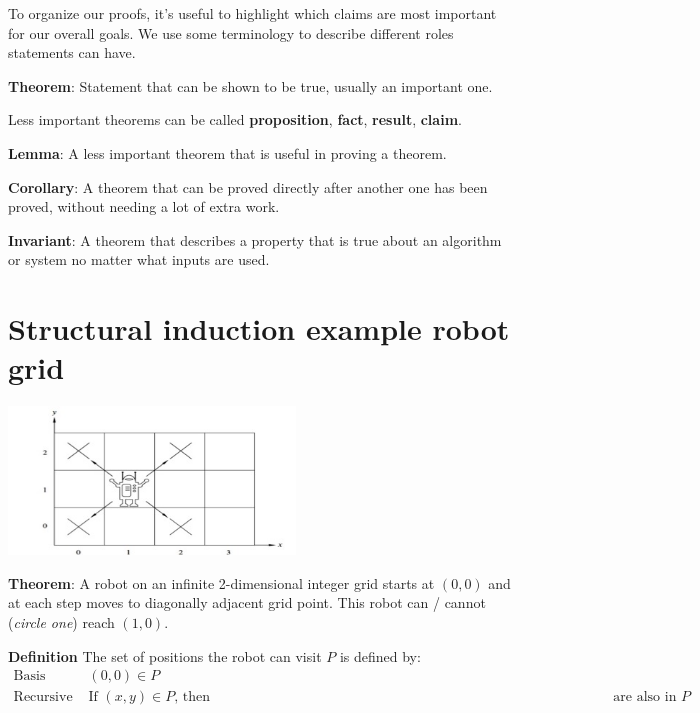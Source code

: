 \documentclass[12pt, oneside]{article}
\begin{document}
To organize our proofs, it's useful to highlight which claims are most important for 
our overall goals.
We use some terminology to describe different roles statements can have.

{\bf Theorem}: Statement that can be shown to be true, usually an important one.

Less important theorems can be called {\bf proposition}, {\bf fact}, {\bf result}, {\bf claim}.

{\bf Lemma}: A less important theorem that is useful in proving a theorem.
 
{\bf Corollary}: A theorem that can be proved directly after another one has been proved, 
without needing a lot of extra work.

{\bf Invariant}: A theorem that describes a property that is true about an algorithm or 
system no matter what inputs are used.




 \vfill
\section*{Structural induction example robot grid}


\begin{center}
    \includegraphics[width=3in]{../../resources/images/robot-grid.png}
\end{center}
    
{\bf Theorem}: A robot on an infinite 2-dimensional integer grid starts at $(0,0)$ and at each step moves
to diagonally adjacent grid point. This robot can / cannot {\footnotesize({\it circle one})} reach $(1,0)$.


{\bf Definition} The set of positions the robot can visit  $P$ is defined by:
\[
\begin{array}{ll}
    \textrm{Basis Step: } & (0,0) \in P \\
    \textrm{Recursive Step: } & \textrm{If } (x,y) \in P  \textrm{, then } 
    \phantom{(x+1, y+1), (x+1, y-1), (x-1, y-1), (x-1, y+1)} \textrm{ are also in } P
\end{array}
\]
\end{document}
